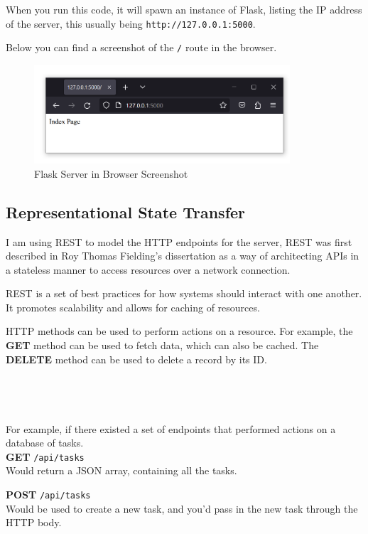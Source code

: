 When you run this code, it will spawn an instance of Flask,
listing the IP address of the server,
this usually being \texttt{http://127.0.0.1:5000}.

Below you can find a screenshot of the
\texttt{/} route in the browser.


\begin{figure}[h!]
    \centering
    \label{image:dockerDiagram}
    \includegraphics[width=0.85\textwidth]{images/screenshots/flask_server_screenshot}
    \caption{Flask Server in Browser Screenshot}
\end{figure}

\subsection{Representational State Transfer}
I am using REST to model the HTTP endpoints for the server,
REST was first described in Roy Thomas Fielding's dissertation \cite{REST}
as a way of architecting APIs in a stateless manner to
access resources over a network connection.

REST is a set of best practices for how systems should interact with one another.
It promotes scalability and allows for caching of resources.

HTTP methods can be used to perform actions on a resource.
For example, the \textbf{GET} method can be used to fetch data,
which can also be cached.
The \textbf{DELETE} method can be used to delete a record by its ID. \\ \\ \\ \\ \\

For example, if there existed a set of endpoints that
performed actions on a database of tasks. \\

\textbf{GET} \texttt{/api/tasks} \\
Would return a JSON array, containing all the tasks.

\textbf{POST} \texttt{/api/tasks} \\
Would be used to create a new task,
and you'd pass in the new task through the HTTP body.


